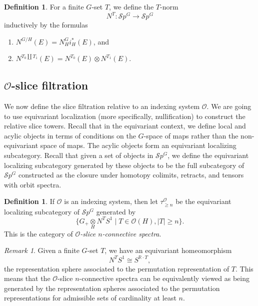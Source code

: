 \documentclass{amsart}
\newcommand{\otimesover}[1]{\underset{#1}{\otimes}}
\newcommand{\cc}[1]{\mathcal #1}
\newcommand{\cO}{\cc{O}}
\newcommand{\Sp}{\mathcal Sp}
\numberwithin{equation}{section}
\theoremstyle{remark}
\newtheorem{remark}[theorem]{Remark}
\theoremstyle{definition}
\newtheorem{definition}[theorem]{Definition}
\begin{document}
\begin{definition}
    For a finite \(G\)-set \(T\), we define the \(T\)-norm
    \[
        N^T\colon\Sp^G\to\Sp^G
    \]
    inductively by the formulas
    \begin{enumerate}
        \item \(N^{G/H}(E)=N_H^G i_H^\ast(E)\), and
        \item \(N^{T_0\amalg T_1}(E)=N^{T_0}(E)\otimes N^{T_1}(E)\).
    \end{enumerate}
\end{definition}

\subsection{\texorpdfstring{\(\cO\)}{O}-slice filtration}

We now define the slice filtration relative to an indexing system
$\cO$.  We are going to use equivariant localization (more
specifically, nullification) to construct the relative slice towers.
Recall that in the equivariant context, we define local and acylic
objects in terms of conditions on the $G$-space of maps rather than
the non-equivariant space of maps.  The acylic objects form an
equivariant localizing subcategory.  Recall that given a set of
objects in $\Sp^G$, we define the equivariant localizing subcategory
generated by these objects to be the full subcategory of $\Sp^G$
constructed as the closure under homotopy colimits, retracts, and
tensors with orbit spectra.

\begin{definition}
    If \(\cO\) is an indexing system, then let \(\tau_{\geq n}^{\cO}\) be the equivariant localizing subcategory of $\Sp^G$ generated by 
    \[
    \Big\{ G_+\otimesover{H} N^T S^1\mid T\in \cO(H), |T|\geq n\Big\}.
    \]
    This is the category of \emph{\(\cO\)-slice \(n\)-connective spectra}.
\end{definition}

\begin{remark}
    Given a finite \(G\)-set \(T\), we have an equivariant homeomorphism
    \[
        N^T S^1\cong S^{\mathbb R\cdot T},
    \]
    the representation sphere associated to the permutation representation of \(T\). This means that the \(\cO\)-slice \(n\)-connective spectra can be equivalently viewed as being generated by the representation spheres associated to the permutation representations for admissible sets of cardinality at least \(n\). 
\end{remark}
\end{document}
